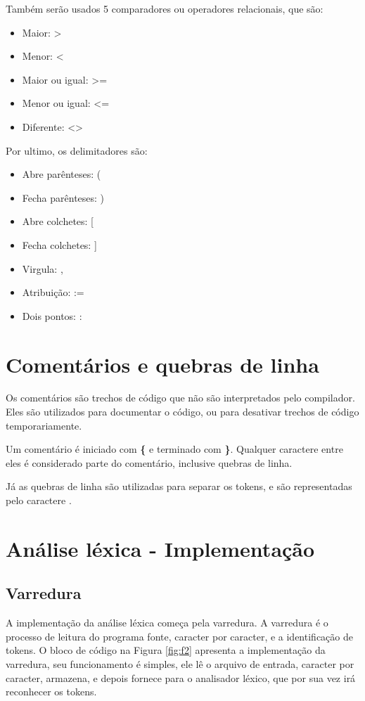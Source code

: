 \documentclass[12pt]{article}
\begin{document}
Também serão usados 5 comparadores ou operadores relacionais, que são:

\begin{itemize}
    \item Maior: >
    \item Menor: <
    \item Maior ou igual: >=
    \item Menor ou igual: <=
    \item Diferente: <>
\end{itemize}

Por ultimo, os delimitadores são:

\begin{itemize}
    \item Abre parênteses: (
    \item Fecha parênteses: )
    \item Abre colchetes: [
    \item Fecha colchetes: ]
    \item Virgula: ,
    \item Atribuição: :=
    \item Dois pontos: :
  \end{itemize}


\section{Comentários e quebras de linha}

Os comentários são trechos de código que não são interpretados pelo compilador. Eles são utilizados para documentar o código, ou para desativar trechos de código temporariamente.

Um comentário é iniciado com \textbf{\{} e terminado com \textbf{\}}. Qualquer caractere entre eles é considerado parte do comentário, inclusive quebras de linha.

Já as quebras de linha são utilizadas para separar os tokens, e são representadas pelo caractere \textbf{\n}.

\section{Análise léxica - Implementação}

\subsection{Varredura}
A implementação da análise léxica começa pela varredura. A varredura é o processo de leitura do programa fonte, caracter por caracter, e a identificação de tokens.
O bloco de código na Figura \ref{fig:f2} apresenta a implementação da varredura, seu funcionamento é simples, ele lê o arquivo de entrada, caracter por caracter, armazena, e depois fornece para o analisador léxico, que por sua vez irá reconhecer os tokens.
\end{document}
